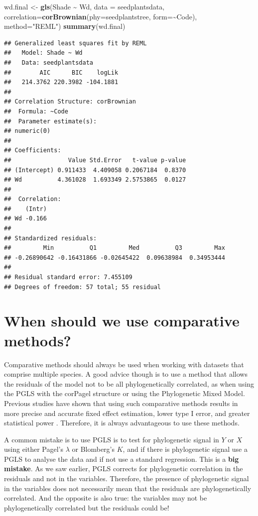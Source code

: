 \documentclass[
]{book}
\newenvironment{Shaded}{\begin{snugshade}}{\end{snugshade}}
\newcommand{\AttributeTok}[1]{\textcolor[rgb]{0.13,0.29,0.53}{#1}}
\newcommand{\FunctionTok}[1]{\textcolor[rgb]{0.13,0.29,0.53}{\textbf{#1}}}
\newcommand{\NormalTok}[1]{#1}
\newcommand{\OtherTok}[1]{\textcolor[rgb]{0.56,0.35,0.01}{#1}}
\newcommand{\SpecialCharTok}[1]{\textcolor[rgb]{0.81,0.36,0.00}{\textbf{#1}}}
\newcommand{\StringTok}[1]{\textcolor[rgb]{0.31,0.60,0.02}{#1}}
\begin{document}
\begin{Shaded}
\begin{Highlighting}[]
\NormalTok{wd.final }\OtherTok{\textless{}{-}} \FunctionTok{gls}\NormalTok{(Shade }\SpecialCharTok{\textasciitilde{}}\NormalTok{ Wd, }\AttributeTok{data =}\NormalTok{ seedplantsdata,}
                \AttributeTok{correlation=}\FunctionTok{corBrownian}\NormalTok{(}\AttributeTok{phy=}\NormalTok{seedplantstree, }\AttributeTok{form=}\SpecialCharTok{\textasciitilde{}}\NormalTok{Code), }
                \AttributeTok{method=}\StringTok{"REML"}\NormalTok{)}
\FunctionTok{summary}\NormalTok{(wd.final)}
\end{Highlighting}
\end{Shaded}

\begin{verbatim}
## Generalized least squares fit by REML
##   Model: Shade ~ Wd 
##   Data: seedplantsdata 
##        AIC      BIC    logLik
##   214.3762 220.3982 -104.1881
## 
## Correlation Structure: corBrownian
##  Formula: ~Code 
##  Parameter estimate(s):
## numeric(0)
## 
## Coefficients:
##                Value Std.Error   t-value p-value
## (Intercept) 0.911433  4.409058 0.2067184  0.8370
## Wd          4.361028  1.693349 2.5753865  0.0127
## 
##  Correlation: 
##    (Intr)
## Wd -0.166
## 
## Standardized residuals:
##         Min          Q1         Med          Q3         Max 
## -0.26890642 -0.16431866 -0.02645422  0.09638984  0.34953444 
## 
## Residual standard error: 7.455109 
## Degrees of freedom: 57 total; 55 residual
\end{verbatim}

\chapter{When should we use comparative methods?}\label{when-should-we-use-comparative-methods}

Comparative methods should always be used when working with datasets that comprise multiple species. A good advice though is to use a method that allows the residuals of the model not to be all phylogenetically correlated, as when using the PGLS with the corPagel structure or using the Phylogenetic Mixed Model. Previous studies have shown that using such comparative methods results in more precise and accurate fixed effect estimation, lower type I error, and greater statistical power \citep{revell2010phylogenetic}. Therefore, it is always advantageous to use these methods.

A common mistake is to use PGLS is to test for phylogenetic signal in \(Y\) or \(X\) using either Pagel's \(\lambda\) or Blomberg's \(K\), and if there is phylogenetic signal use a PGLS to analyse the data and if not use a standard regression. This is a \textbf{big mistake}. As we saw earlier, PGLS corrects for phylogenetic correlation in the residuals and not in the variables. Therefore, the presence of phylogenetic signal in the variables does not necessarily mean that the residuals are phylogenetically correlated. And the opposite is also true: the variables may not be phylogenetically correlated but the residuals could be!
\end{document}
